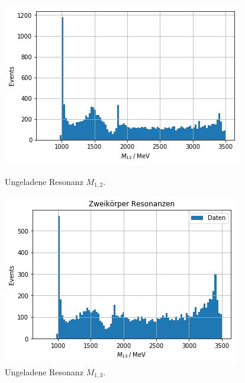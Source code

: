\begin{figure}
  \centering
    \includegraphics[width=\linewidth]{plots/real_data_twobody_resonance_m12.png}
    \caption{Ungeladene Resonanz $M_{1,2}$.
    \label{fig:rm12}}
  \endminipage\hfill
    \includegraphics[width=\linewidth]{plots/real_data_twobody_resonance_m13.png}
    \caption{Ungeladene Resonanz $M_{1,3}$.
    \label{fig:rm13}}
  \endminipage
  \label{fig:real_resonances}
\end{figure}

